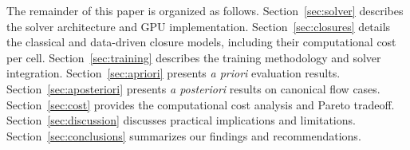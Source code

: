 The remainder of this paper is organized as follows.
Section~\ref{sec:solver} describes the solver architecture and GPU implementation.
Section~\ref{sec:closures} details the classical and data-driven closure models, including their computational cost per cell.
Section~\ref{sec:training} describes the training methodology and solver integration.
Section~\ref{sec:apriori} presents \emph{a priori} evaluation results.
Section~\ref{sec:aposteriori} presents \emph{a posteriori} results on canonical flow cases.
Section~\ref{sec:cost} provides the computational cost analysis and Pareto tradeoff.
Section~\ref{sec:discussion} discusses practical implications and limitations.
Section~\ref{sec:conclusions} summarizes our findings and recommendations.
